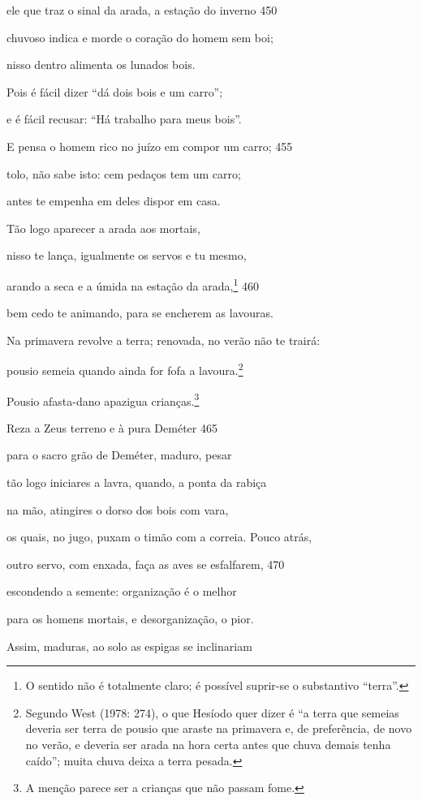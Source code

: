 ele que traz o sinal da arada, a estação do inverno \num{450}

chuvoso indica e morde o coração do homem sem boi;

nisso dentro alimenta os lunados bois.

Pois é fácil dizer ``dá dois bois e um carro'';

e é fácil recusar: ``Há trabalho para meus bois''.

E pensa o homem rico no juízo em compor um carro; \num{455}

tolo, não sabe isto: cem pedaços tem um carro;

antes te empenha em deles dispor em casa.

Tão logo aparecer a arada aos mortais,

nisso te lança, igualmente os servos e tu mesmo,

arando a seca e a úmida na estação da arada,\footnote{O sentido não é totalmente claro; é possível suprir-se o substantivo ``terra''.} \num{460}

bem cedo te animando, para se encherem as lavouras.

Na primavera revolve a terra; renovada, no verão não te trairá:

pousio semeia quando ainda for fofa a lavoura.\footnote{Segundo West (1978: 274), o que Hesíodo quer dizer é ``a terra
que semeias deveria ser terra de pousio que araste na primavera e, de
preferência, de novo no verão, e deveria ser arada na hora certa antes
que chuva demais tenha caído''; muita chuva deixa a terra pesada.}

Pousio afasta-dano apazigua crianças.\footnote{A menção parece ser a crianças que não passam fome.}

Reza a Zeus terreno e à pura Deméter \num{465}

para o sacro grão de Deméter, maduro, pesar

tão logo iniciares a lavra, quando, a ponta da rabiça

na mão, atingires o dorso dos bois com vara,

os quais, no jugo, puxam o timão com a correia. Pouco atrás,

outro servo, com enxada, faça as aves se esfalfarem, \num{470}

escondendo a semente: organização é o melhor

para os homens mortais, e desorganização, o pior.

Assim, maduras, ao solo as espigas se inclinariam

